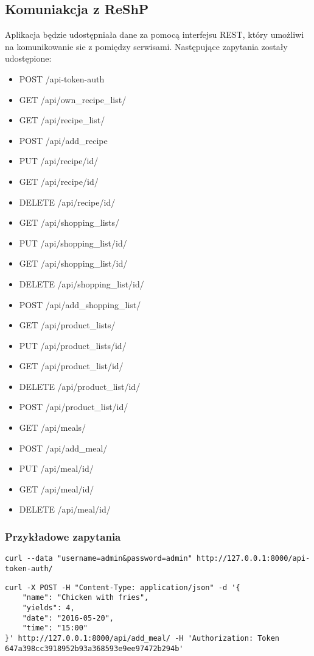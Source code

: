 \documentclass{article}
\begin{document}
\subsection{Komuniakcja z ReShP}
Aplikacja będzie udostępniała dane za pomocą interfejsu REST, który umożliwi na komunikowanie sie z pomiędzy serwisami. Następujące zapytania zostały udostępione:
\begin{itemize}
\item POST /api-token-auth
\item GET /api/own\_recipe\_list/
\item GET /api/recipe\_list/
\item POST /api/add\_recipe
\item PUT /api/recipe/{id}/
\item GET /api/recipe/{id}/
\item DELETE /api/recipe/{id}/
\item GET /api/shopping\_lists/
\item PUT /api/shopping\_list/{id}/
\item GET /api/shopping\_list/{id}/
\item DELETE /api/shopping\_list/{id}/
\item POST /api/add\_shopping\_list/
\item GET /api/product\_lists/
\item PUT /api/product\_lists/{id}/
\item GET /api/product\_list/{id}/
\item DELETE /api/product\_list/{id}/
\item POST /api/product\_list/{id}/
\item GET /api/meals/
\item POST /api/add\_meal/
\item PUT /api/meal/{id}/
\item GET /api/meal/{id}/
\item DELETE /api/meal/{id}/
\end{itemize}

\subsubsection{Przykładowe zapytania}
\begin{lstlisting}[label=token_api,caption=Pobieranie tokenu,breaklines=true]
curl --data "username=admin&password=admin" http://127.0.0.1:8000/api-token-auth/
\end{lstlisting}

\begin{lstlisting}[label=recipe_api,caption=Dodawanie posiłku,breaklines=true]
curl -X POST -H "Content-Type: application/json" -d '{
    "name": "Chicken with fries",
    "yields": 4,
    "date": "2016-05-20",
    "time": "15:00"
}' http://127.0.0.1:8000/api/add_meal/ -H 'Authorization: Token 647a398cc3918952b93a368593e9ee97472b294b'
\end{lstlisting}
\end{document}

